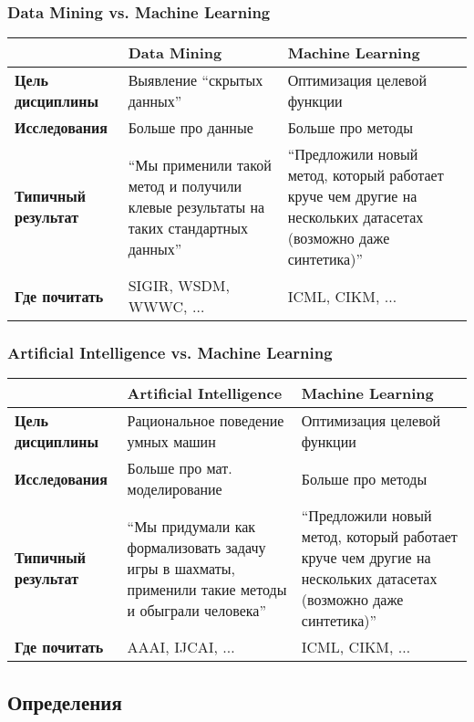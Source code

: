 \documentclass[14pt, fleqn, xcolor={dvipsnames, table}]{beamer}
\begin{document}
\begin{frame}
\frametitle{Data Mining vs. Machine Learning}
\begin{center}
\footnotesize
\begin{tabular}{p{}|p{}|p{}}
\rowcolor{Blue!20}
& \small Data Mining & \small Machine Learning \\
\hline 
\bf Цель дисциплины & Выявление ``скрытых данных'' & Оптимизация целевой функции \\		
\bf Исследования & Больше про данные & Больше про методы \\
\bf Типичный результат & ``Мы применили такой метод и получили клевые результаты на таких стандартных данных'' & ``Предложили новый метод, который работает круче чем другие на нескольких датасетах (возможно даже синтетика)'' \\
\bf Где почитать & SIGIR, WSDM, WWWC, $\ldots$ & ICML, CIKM, $\ldots$ \\
\end{tabular}
\end{center}
\end{frame}

\begin{frame}
\frametitle{Artificial Intelligence vs. Machine Learning}
\begin{center}
\footnotesize
\begin{tabular}{p{}|p{}|p{}}
\rowcolor{Blue!20}
& \small Artificial Intelligence & \small Machine Learning \\
\hline 
\bf Цель дисциплины & Рациональное поведение умных машин & Оптимизация целевой функции \\		
\bf Исследования & Больше про мат. моделирование & Больше про методы \\
\bf Типичный результат & ``Мы придумали как формализовать задачу игры в шахматы, применили такие методы и обыграли человека'' & ``Предложили новый метод, который работает круче чем другие на нескольких датасетах (возможно даже синтетика)'' \\
\bf Где почитать & AAAI, IJCAI, $\ldots$ & ICML, CIKM, $\ldots$ \\
\end{tabular}
\end{center}
\end{frame}

\subsection{Определения}
\end{document}
